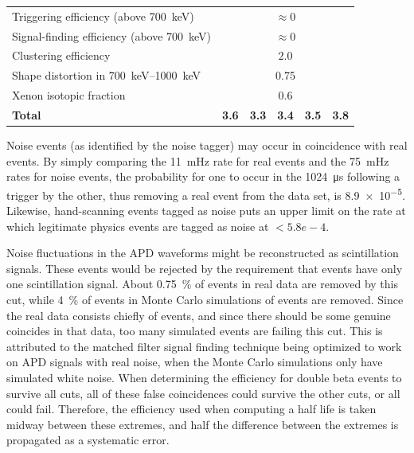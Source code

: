 \documentclass[herrin-thesis.tex]{subfiles}
\begin{document}
\begin{table}[htp]
\begin{tabular}{p{} c c c c c}
Triggering efficiency	(above \SI{700}{\keV})			&	\multicolumn{5}{c}{\(\approx 0\)}			\\
Signal-finding efficiency (above \SI{700}{\keV})		&	\multicolumn{5}{c}{\(\approx 0\)}			\\
Clustering efficiency								&	\multicolumn{5}{c}{\(2.0\)}	\\
Shape distortion in \SIrange{700}{1000}{\keV}			&	\multicolumn{5}{c}{0.75}					\\
Xenon isotopic fraction							&	\multicolumn{5}{c}{0.6}					\\\midrule
\textbf{Total}									&\textbf{3.6}&\textbf{3.3}&\textbf{3.4}&\textbf{3.5}&\textbf{3.8}\\\bottomrule
\end{tabular}
\end{table}

Noise events (as identified by the noise tagger) may occur in coincidence with real events. By simply comparing the \SI{11}{\milli\Hz} rate for real events and the \SI{75}{\milli\Hz} rates for noise events, the probability for one to occur in the \SI{1024}{\micro\s} following a trigger by the other, thus removing a real event from the data set, is \num{8.9e-5}. Likewise, hand-scanning events tagged as noise puts an upper limit on the rate at which legitimate physics events are tagged as noise at \(< 5.8e-4\).

Noise fluctuations in the APD waveforms might be reconstructed as scintillation signals. These events would be rejected by the requirement that events have only one scintillation signal. About \SI{0.75}{\percent} of events in real data are removed by this cut, while \about{}\SI{4}{\percent} of events in Monte Carlo simulations of \twonu{} events are removed. Since the real data consists chiefly of \twonu{} events, and since there should be some genuine coincides in that data, too many simulated events are failing this cut. This is attributed to the matched filter signal finding technique being optimized to work on APD signals with real noise, when the Monte Carlo simulations only have simulated white noise. When determining the efficiency for double beta events to survive all cuts, all of these false coincidences could survive the other cuts, or all could fail. Therefore, the efficiency used when computing a half life is taken midway between these extremes, and half the difference between the extremes is propagated as a systematic error.
\end{document}
